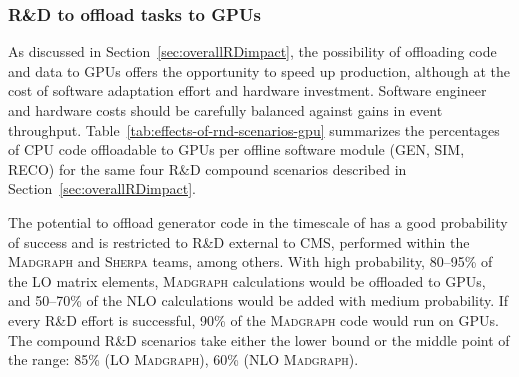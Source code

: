 \begin{table}[tbph]
\begin{tabular}{|l|c|c|c|c|}
    \end{tabular}
    \label{tab:effects-of-rnd-scenarios-cpu}
\end{table}

\subsubsection{R\&D to offload tasks to \glspl{GPU}}
\label{sec:effect-GPU}

As discussed in Section~\ref{sec:overallRDimpact}, the possibility of offloading code and data to \glspl{GPU} offers the opportunity to speed up production, although at the cost of software adaptation effort and hardware investment. Software engineer and hardware costs should be carefully balanced against gains in event throughput. Table~\ref{tab:effects-of-rnd-scenarios-gpu} summarizes the percentages of \gls{CPU} code offloadable to \glspl{GPU} per offline software module (\gls{GEN}, \gls{SIM}, \gls{RECO}) for the same four R\&D compound scenarios described in Section~\ref{sec:overallRDimpact}. 

The potential to offload generator code in the timescale of \RunFour has a good probability of success and is restricted to R\&D external to CMS, performed within the \textsc{Madgraph} and \textsc{Sherpa} teams, among others. With high probability, 80--95\% of the \gls{LO} matrix elements, \textsc{Madgraph} calculations would be offloaded to \glspl{GPU}, and 50--70\% of the \gls{NLO} calculations would be added with medium probability. If every R\&D effort is successful, 90\% of the \textsc{Madgraph} code would run on \glspl{GPU}. The compound R\&D scenarios take either the lower bound or the middle point of the range: 85\% (\gls{LO} \textsc{Madgraph}), 60\% (\gls{NLO} \textsc{Madgraph}).

